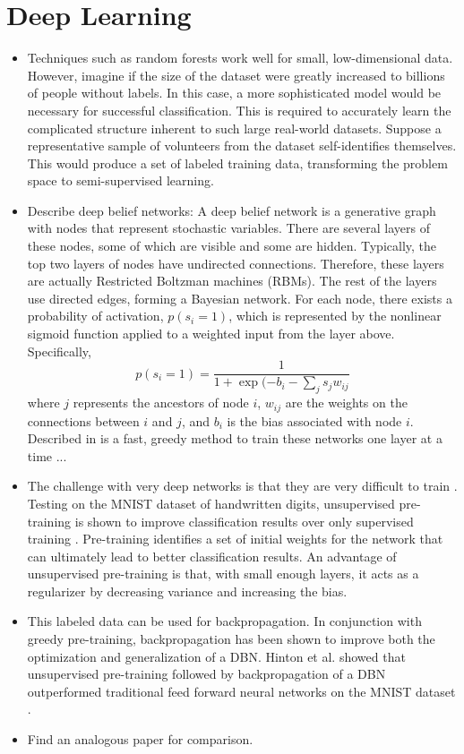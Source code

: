 \documentclass[12pt]{report}
\begin{document}
\section{Deep Learning}
\begin{itemize}
\item Techniques such as random forests work well for small, low-dimensional data.  However, imagine if the size of the dataset were greatly increased to billions of people without labels.  In this case, a more sophisticated model would be necessary for successful classification.  This is required to accurately learn the complicated structure inherent to such large real-world datasets.
Suppose a representative sample of volunteers from the dataset self-identifies themselves.
This would produce a set of labeled training data, transforming the problem space to semi-supervised learning. 
\item Describe deep belief networks: A deep belief network is a generative graph with nodes that represent stochastic variables.
There are several layers of these nodes, some of which are visible and some are hidden.
Typically, the top two layers of nodes have undirected connections.
Therefore, these layers are actually Restricted Boltzman machines (RBMs).
The rest of the layers use directed edges, forming a Bayesian network.
For each node, there exists a probability of activation, $p(s_i=1)$, which is represented by the nonlinear sigmoid function applied to a weighted input from the layer above.
Specifically,
\begin{equation}
p(s_i=1) = \frac{1}{1+\exp(-b_i-\sum_j s_j w_{ij}}
\end{equation}
where $j$ represents the ancestors of node $i$, $w_{ij}$ are the weights on the connections between $i$ and $j$, and $b_i$ is the bias associated with node $i$.  
Described in \cite{hinton_fast_2006} is a fast, greedy method to train these networks one layer at a time ...
\item  The challenge with very deep networks is that they are very difficult to train \cite{bengio_learning_2009}. Testing on the MNIST dataset of handwritten digits, unsupervised pre-training is shown to improve classification results over only supervised training  \cite{erhan_why_2010}. Pre-training identifies a set of initial weights for the network that can ultimately lead to better classification results.  An advantage of unsupervised pre-training is that, with small enough layers, it acts as a regularizer by decreasing variance and increasing the bias.  
\item This labeled data can be used for backpropagation.  In conjunction with greedy pre-training, backpropagation has been shown to improve both the optimization and generalization of a DBN. 
Hinton et al. showed that unsupervised pre-training followed by backpropagation of a DBN outperformed traditional feed forward neural networks on the MNIST dataset \cite{hinton_fast_2006}.
\item Find an analogous paper for comparison.
\end{itemize}
\end{document}
